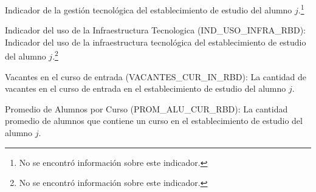 \begin{longdescription}
     Indicador de la gestión tecnológica del establecimiento de estudio del alumno $j$.\footnote{No se encontró información sobre este indicador.}
     \item[Indicador del uso de la Infraestructura Tecnologica](IND\_USO\_INFRA\_RBD):
     Indicador del uso de la infraestructura tecnológica del establecimiento de estudio del alumno $j$.\footnote{No se encontró información sobre este indicador.}
     \item[Vacantes en el curso de entrada](VACANTES\_CUR\_IN\_RBD):
     La cantidad de vacantes en el curso de entrada en el establecimiento de estudio del alumno $j$.
     \item[Promedio de Alumnos por Curso](PROM\_ALU\_CUR\_RBD):
        La cantidad promedio de alumnos que contiene un curso en el establecimiento de estudio del alumno $j$.
\end{longdescription}